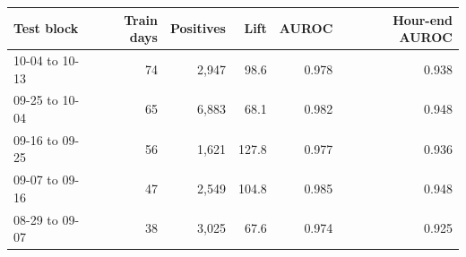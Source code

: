 \begin{tabular}{lrrrrr}
\toprule
Test block & Train days & Positives & Lift & AUROC & Hour-end AUROC \\
\midrule
10-04 to 10-13 & 74 & 2{,}947 & 98.6 & 0.978 & 0.938 \\
09-25 to 10-04 & 65 & 6{,}883 & 68.1 & 0.982 & 0.948 \\
09-16 to 09-25 & 56 & 1{,}621 & 127.8 & 0.977 & 0.936 \\
09-07 to 09-16 & 47 & 2{,}549 & 104.8 & 0.985 & 0.948 \\
08-29 to 09-07 & 38 & 3{,}025 & 67.6 & 0.974 & 0.925 \\
\bottomrule
\end{tabular}
